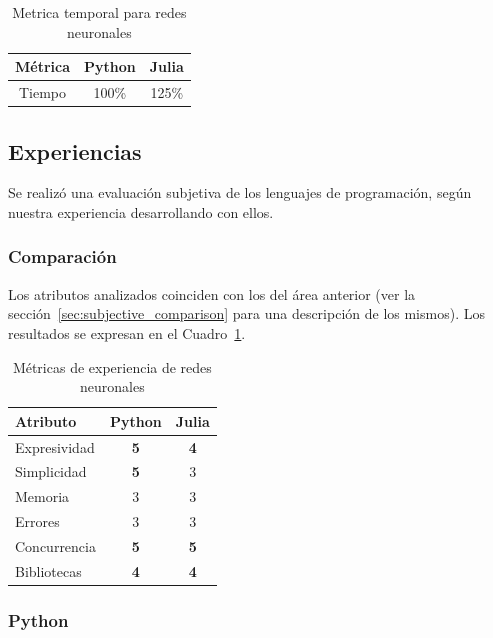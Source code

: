 \documentclass[11pt]{article}
\let\Oldsubsection\subsection
\renewcommand{\subsection}{\FloatBarrier\Oldsubsection}
\let\Oldsubsubsection\subsubsection
\renewcommand{\subsubsection}{\FloatBarrier\Oldsubsubsection}
\newcommand{\goodMetric}[1]{{\textbf{#1}}}
\begin{document}
\begin{table}[H]
\centering
\begin{tabular}{|c|c|c|}
\hline
Métrica & Python & Julia \\ \hline
Tiempo & 100\% & 125\% \\ \hline
\end{tabular}
\caption{Metrica temporal para redes neuronales}
\end{table}

\subsection{Experiencias}

Se realizó una evaluación subjetiva de los lenguajes de programación, según nuestra experiencia desarrollando con ellos.

\subsubsection{Comparación}

Los atributos analizados coinciden con los del área anterior (ver la sección~\ref{sec:subjective_comparison} para una descripción de los mismos).
Los resultados se expresan en el Cuadro~\ref{tab:nn:experiences}.

\begin{table}[h]
\centering
\begin{tabular}{|l|cc|}
\hline
Atributo & \multicolumn{1}{c|}{Python} & Julia \\ \hline
Expresividad & \multicolumn{1}{c|}{\goodMetric{5}} & \goodMetric{4} \\ \hline
Simplicidad & \multicolumn{1}{c|}{\goodMetric{5}} & 3 \\ \hline
Memoria & \multicolumn{1}{c|}{3} & 3 \\ \hline
Errores & \multicolumn{1}{c|}{3} & 3 \\ \hline
Concurrencia & \multicolumn{1}{c|}{\goodMetric{5}} & \goodMetric{5} \\ \hline
Bibliotecas & \multicolumn{1}{c|}{\goodMetric{4}} & \goodMetric{4} \\ \hline
\end{tabular}
\caption{Métricas de experiencia de redes neuronales}
\label{tab:nn:experiences}
\end{table}

\subsubsection{Python}
\end{document}
